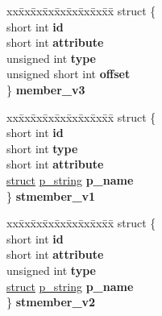 \begin{DoxyCompactItemize}
\begin{tabbing}
\end{tabbing}\item 
\mbox{\label{unioncodeview__fieldtype_a22966057699c3e88f85fb34079b879de}} 
\begin{tabbing}
xx\=xx\=xx\=xx\=xx\=xx\=xx\=xx\=xx\=\kill
struct \{\\
\>short int {\bfseries id}\\
\>short int {\bfseries attribute}\\
\>unsigned int {\bfseries type}\\
\>unsigned short int {\bfseries offset}\\
\} {\bfseries member\_v3}\\

\end{tabbing}\item 
\mbox{\label{unioncodeview__fieldtype_a3cdaf2d6ea441abaddde9d6478e808c1}} 
\begin{tabbing}
xx\=xx\=xx\=xx\=xx\=xx\=xx\=xx\=xx\=\kill
struct \{\\
\>short int {\bfseries id}\\
\>short int {\bfseries type}\\
\>short int {\bfseries attribute}\\
\>\hyperlink{interfacestruct}{struct} \hyperlink{structp__string}{p\_string} {\bfseries p\_name}\\
\} {\bfseries stmember\_v1}\\

\end{tabbing}\item 
\mbox{\label{unioncodeview__fieldtype_a302fe041cb4d9f9afc9de3e1a4c9c1b8}} 
\begin{tabbing}
xx\=xx\=xx\=xx\=xx\=xx\=xx\=xx\=xx\=\kill
struct \{\\
\>short int {\bfseries id}\\
\>short int {\bfseries attribute}\\
\>unsigned int {\bfseries type}\\
\>\hyperlink{interfacestruct}{struct} \hyperlink{structp__string}{p\_string} {\bfseries p\_name}\\
\} {\bfseries stmember\_v2}\\


\end{tabbing}
\end{DoxyCompactItemize}
